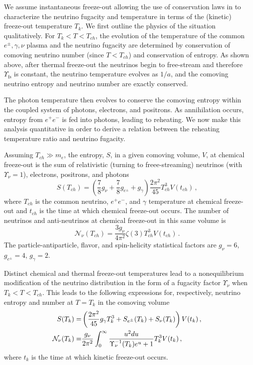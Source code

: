 We assume instantaneous freeze-out allowing the use of conservation laws in  to characterize the neutrino fugacity and temperature in terms of the (kinetic) freeze-out temperature $T_k$. We first outline the physics of the situation qualitatively. For $T_k<T<T_{ch}$, the evolution of the temperature of the common $e^\pm,\gamma,\nu$ plasma and the neutrino fugacity are determined by conservation of comoving neutrino number (since $T<T_{ch}$) and conservation of entropy. As shown above, after thermal freeze-out the neutrinos begin to free-stream and therefore $\Upsilon_\mathrm{fs}$ is constant, the neutrino temperature evolves as $1/a$, and the comoving neutrino entropy and neutrino number are exactly conserved. 

The photon temperature then evolves to conserve the comoving entropy within the coupled system of photons, electrons, and positrons. As annihilation occurs, entropy from $e^+e^-$ is fed into photons, leading to reheating. We now make this analysis quantitative in order to derive a relation between the reheating temperature ratio and neutrino fugacity.

Assuming $T_{ch}\gg m_e$, the entropy, $S$, in a given comoving volume, $V$, at chemical freeze-out is the sum of relativistic (turning to freee-streaming) neutrinos (with $\Upsilon_\nu=1$), electrons, positrons, and photons
\begin{equation}
S(T_{ch})=\left(\frac{7}{8}g_\nu+\frac{7}{8}g_{e^\pm} +g_\gamma \right)\frac{2\pi^2}{45} T_{ch}^3V(t_{ch})\,,
\end{equation}
where $T_{ch}$ is the common neutrino, $e^+e^-$, and $\gamma$ temperature at chemical freeze-out and $t_{ch}$ is the time at which chemical freeze-out occurs. The number of neutrinos and anti-neutrinos at chemical freeze-out in this same volume is
\begin{equation}
\mathcal{N}_\nu(T_{ch})=\frac{3g_\nu}{4\pi^2}\zeta(3)T_{ch}^3V(t_{ch})\,.
\end{equation}
The particle-antiparticle, flavor, and spin-helicity statistical factors are $g_\nu=6$, $g_{e^\pm}=4$, $g_\gamma=2$.

Distinct chemical and thermal freeze-out temperatures lead to a nonequilibrium modification of the neutrino distribution in the form of a fugacity factor $\Upsilon_\nu$ when $T_k<T<T_{ch}$. This leads to the following expressions for, respectively, neutrino entropy and number at $T=T_k$ in the comoving volume
\begin{align}
S(T_k)=&\left(\frac{2\pi^2}{45}g_\gamma T_k^3+S_{e^\pm}(T_k)+S_{\nu}(T_k)\right)V(t_k)\,,\\
\mathcal{N}_{\nu}(T_k)=&\frac{g_\nu}{2\pi^2}\int_0^\infty \frac{u^2 du}{\Upsilon_\nu^{-1}(T_k)e^u+1}T_k^3V(t_k)\,,\notag
\end{align}
where $t_k$ is the time at which kinetic freeze-out occurs.

